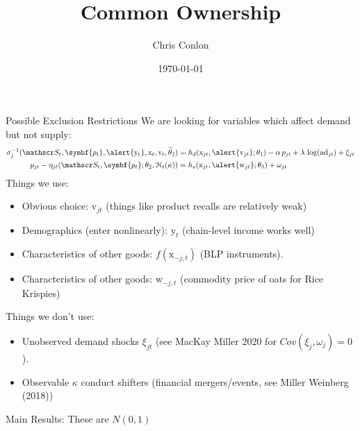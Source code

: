 \documentclass[aspectratio=169,10pt]{beamer}
\begin{document}
\title{Common Ownership}
\author{Chris Conlon}
\date{\today}

\frame{\titlepage}


\begin{frame}{Possible Exclusion Restrictions}
We are looking for variables which affect \alert{demand but not supply}:
\begin{align*}
\sigma_{j}^{-1}(\calS_t, \symbf{p_t},\alert{\mathrm{y_t}}, \mathrm{x}_t,  \mathrm{v}_t, \widetilde{\theta}_2) 
&= h_d(\mathrm{x}_{jt},\alert{ \mathrm{v}_{jt}}; \theta_1) - \alpha\, p_{jt} + \lambda \, \log(\text{ad}_{jt})+ \xi_{jt} \\
p_{jt} - \eta_{jt}(\calS_t, \symbf{p_t}; \theta_2, \mathcal{H}_t(\kappa))
&= h_s(\textrm{x}_{jt}, \alert{\mathrm{w}_{jt}}; \theta_3) + \omega_{jt} 
\end{align*}
Things we use:
\begin{itemize}
    \item Obvious choice: $\mathrm{v}_{jt}$ (things like product recalls are relatively weak)
    \item Demographics (enter nonlinearly): $\mathrm{y}_t$ (chain-level income works well)
    \item Characteristics of other goods: $f(\mathrm{x}_{-j,t})$ (BLP instruments).
    \item Characteristics of other goods: $\mathrm{w}_{-j,t}$ (commodity price of oats for Rice Krispies)
\end{itemize}

Things we don't use:
\begin{itemize}
    \item Unobserved demand shocks $\xi_{jt}$ (see MacKay Miller 2020 for $Cov(\xi_j,\omega_j)=0$).
    \item Observable $\kappa$ conduct shifters (financial mergers/events, see Miller Weinberg (2018))
\end{itemize}
\end{frame}


\begin{frame}[plain,label=mainresults]{Main Results: These are $N(0,1)$}
\begin{center}
\scalebox{0.55}{}
\end{center}
\end{frame}
\end{document}

